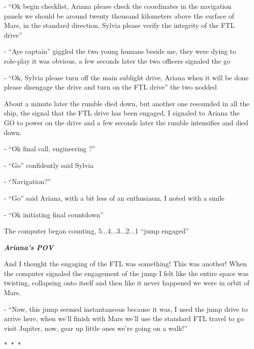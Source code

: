 \documentclass[hidelinks,12pt,a4paper]{book}
\newcommand\sep{\begin{center}
  \boldmath $\ast$~$\ast$~$\ast$
\end{center}}
\begin{document}
- “Ok begin checklist, Ariana please check the coordinates in the navigation panels we should be around twenty 
thousand kilometers above the surface of Mars, in the standard direction, 
Sylvia please verify the integrity of the FTL drive”\par
\bigskip

- “Aye captain” giggled the two young humans beside me, they were dying to role-play it was obvious, 
a few seconds later the two officers signaled the go\par
\bigskip

- “Ok, Sylvia please turn off the main sublight drive, Ariana when it will be done please disengage the 
drive and turn on the FTL drive” the two nodded\par
\bigskip

About a minute later the rumble died down, but another one resounded in all the ship, the signal that the 
FTL drive has been engaged, I signaled to Ariana the GO to power on the drive and a few seconds later the 
rumble intensifies and died down. \par
\bigskip

- “Ok final call, engineering ?”\par
\bigskip
- “Go” confidently said Sylvia\par
\bigskip
- “Navigation?”\par
\bigskip
- “Go” said Ariana, with a bit less of an enthusiasm, I noted with a smile\par
\bigskip
- “Ok initiating final countdown”\par
\bigskip

The computer began counting, 5...4...3...2...1 “jump engaged”\par
\bigskip

\textit{\textbf{Ariana's POV}}\par
\bigskip

And I thought the engaging of the FTL was something! This was another! 
When the computer signaled the engagement of the jump I felt like the entire space was twisting, 
collapsing onto itself and then like it never happened we were in orbit of Mars.\par
\bigskip

- “Now, this jump seemed instantaneous because it was, I used the jump drive to arrive here, 
when we'll finish with Mars we'll use the standard FTL travel to go visit Jupiter, 
now, gear up little ones we're going on a walk!”

\sep
\end{document}
